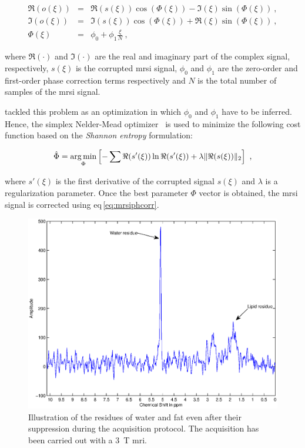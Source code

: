 \begin{eqnarray}
	\Re(o(\xi)) & = & \Re(s(\xi))\cos(\Phi(\xi)) - \Im(\xi)\sin(\Phi(\xi)) \ , \nonumber  \\
	\Im(o(\xi)) & = & \Im(s(\xi))\cos(\Phi(\xi)) + \Re(\xi)\sin(\Phi(\xi)) \ , \nonumber \\
	\Phi(\xi) & = & \phi_0 + \phi_1 \frac{\xi}{N} \ , \label{eq:mrsiphcorr}
\end{eqnarray}

\noindent where $\Re(\cdot)$ and $\Im(\cdot)$ are the real and imaginary part of the complex signal, respectively, $s(\xi)$ is the corrupted \ac{mrsi} signal, $\phi_0$ and $\phi_1$ are the zero-order and first-order phase correction terms respectively and $N$ is the total number of samples of the \ac{mrsi} signal.

\citeauthor{Chen2002} tackled this problem as an optimization in which $\phi_0$ and $\phi_1$ have to be inferred.
Hence, the simplex Nelder-Mead optimizer~\cite{Nelder1965} is used to minimize the following cost function based on the \textit{Shannon entropy} formulation:

\begin{equation}
	\hat{\Phi} = \argmin_{\Phi} \left[ - \sum \Re(s'(\xi)) \ln \Re(s'(\xi)) + \lambda \|\Re(s(\xi))\|_2 \right] \ ,
	\label{eq:phcost}
\end{equation}

\noindent where $s'(\xi)$ is the first derivative of the corrupted signal $s(\xi)$ and $\lambda$ is a regularization parameter.
Once the best parameter $\Phi$ vector is obtained, the \ac{mrsi} signal is corrected using \acs{eq}\,\eqref{eq:mrsiphcorr}.

\begin{figure}
\centering
\includegraphics[width=0.7\linewidth]{3_review/figures/processing/pre-processing/water/water_fat.eps}
\caption[Illustration of water and fat residues in \ac{mrsi} signal after suppression during acquisition.]{Illustration of the residues of water and fat even after their suppression during the acquisition protocol. The acquisition has been carried out with a \SI{3}{\tesla} \ac{mri}.}
\label{fig:waterfat}
\end{figure}

